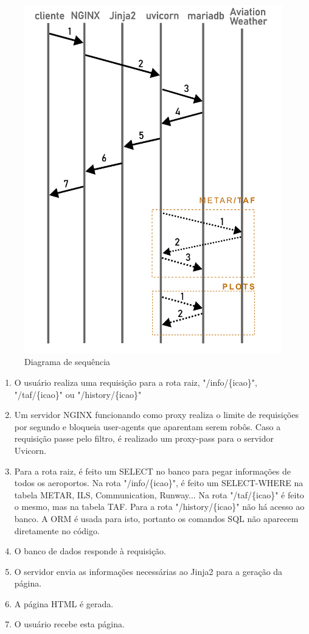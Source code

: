 \begin{figure}[ht]
    \begin{center}
    \includegraphics[width=0.5\linewidth]{img/diagrama-tempo.png}
    \caption{Diagrama de sequência}
    \label{fig:tempo}
    \end{center}
\end{figure}

\begin{enumerate}
\item O usuário realiza uma requisição para a rota raiz, "/info/\{icao\}", "/taf/\{icao\}"
ou "/history/\{icao\}"
\item Um servidor NGINX funcionando como proxy realiza o limite de requisições por segundo
e bloqueia user-agents que aparentam serem robôs. Caso a requisição passe pelo filtro, é
realizado um proxy-pass para o servidor Uvicorn.
\item Para a rota raiz, é feito um SELECT no banco para pegar informações de todos os
aeroportos. Na rota "/info/\{icao\}", é feito um SELECT-WHERE na tabela METAR, ILS, Communication, Runway...
Na rota "/taf/\{icao\}" é feito o mesmo, mas na tabela TAF. Para a rota "/history/\{icao\}"
não há acesso ao banco.
A ORM é usada para isto, portanto os comandos SQL não aparecem diretamente no código.
\item O banco de dados responde à requisição.
\item O servidor envia as informações necessárias ao Jinja2 para a geração da página.
\item A página HTML é gerada.
\item O usuário recebe esta página.
\end{enumerate}

